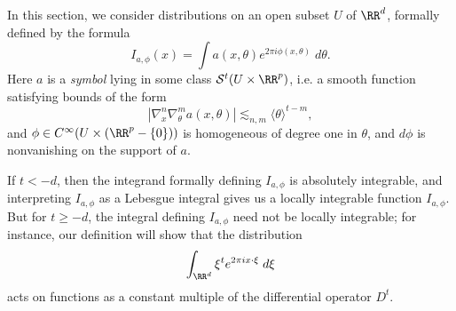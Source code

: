 In this section, we consider distributions on an open subset $U$ of $\RR^d$, formally defined by the formula
%
\[ I_{a,\phi}(x) = \int a(x,\theta) e^{2 \pi i \phi(x,\theta)}\; d\theta. \]
%
Here $a$ is a \emph{symbol} lying in some class $\mathcal{S}^t(U \times \RR^p)$, i.e. a smooth function satisfying bounds of the form
%
\[ |\nabla_x^n \nabla_\theta^m a(x,\theta)| \lesssim_{n,m} \langle \theta \rangle^{t - m}, \]
%
and $\phi \in C^\infty(U \times (\RR^p - \{ 0 \}))$ is homogeneous of degree one in $\theta$, and $d\phi$ is nonvanishing on the support of $a$.

If $t < -d$, then the integrand formally defining $I_{a,\phi}$ is absolutely integrable, and interpreting $I_{a,\phi}$ as a Lebesgue integral gives us a locally integrable function $I_{a,\phi}$. But for $t \geq -d$, the integral defining $I_{a,\phi}$ need not be locally integrable; for instance, our definition will show that the distribution
%
\[ \int_{\RR^d} \xi^t e^{2 \pi i x \cdot \xi}\; d\xi \]
%
acts on functions as a constant multiple of the differential operator $D^t$.

